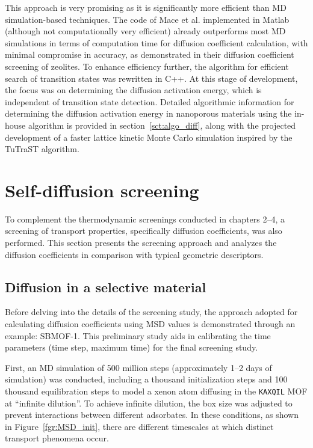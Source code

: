 \documentclass[main]{subfiles}
\begin{document}
This approach is very promising as it is significantly more efficient than MD simulation-based techniques. The code of Mace et al.\autocite{Mace_2019} implemented in Matlab (although not computationally very efficient) already outperforms most MD simulations in terms of computation time for diffusion coefficient calculation, with minimal compromise in accuracy, as demonstrated in their diffusion coefficient screening of zeolites. To enhance efficiency further, the algorithm for efficient search of transition states was rewritten in C++. At this stage of development, the focus was on determining the diffusion activation energy, which is independent of transition state detection. Detailed algorithmic information for determining the diffusion activation energy in nanoporous materials using the in-house algorithm is provided in section~\ref{sct:algo_diff}, along with the projected development of a faster lattice kinetic Monte Carlo simulation inspired by the TuTraST algorithm.


\section{Self-diffusion screening}\label{sct:md_screening}

To complement the thermodynamic screenings conducted in chapters 2--4, a screening of transport properties, specifically diffusion coefficients, was also performed. This section presents the screening approach and analyzes the diffusion coefficients in comparison with typical geometric descriptors.

\subsection{Diffusion in a selective material}

Before delving into the details of the screening study, the approach adopted for calculating diffusion coefficients using MSD values is demonstrated through an example: SBMOF-1\autocite{Banerjee_2016}. This preliminary study aids in calibrating the time parameters (time step, maximum time) for the final screening study.

First, an MD simulation of 500 million steps (approximately 1--2 days of simulation) was conducted, including a thousand initialization steps and 100 thousand equilibration steps to model a xenon atom diffusing in the \texttt{KAXQIL}\autocite{Banerjee2012} MOF at ``infinite dilution''. To achieve infinite dilution, the box size was adjusted to prevent interactions between different adsorbates. In these conditions, as shown in Figure~\ref{fgr:MSD_init}, there are different timescales at which distinct transport phenomena occur. 
\end{document}

